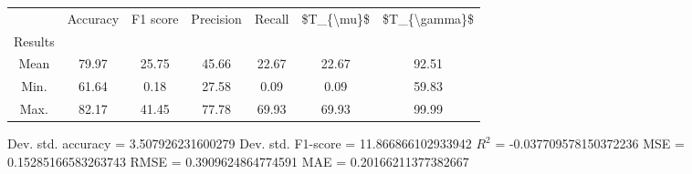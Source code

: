 \begin{tabular}{|c|c|c|c|c|c|c|}
\toprule
{} &  Accuracy &  F1 score &  Precision &  Recall &  \$T\_\{\textbackslash mu\}\$ &  \$T\_\{\textbackslash gamma\}\$ \\
Results &           &           &            &         &            &               \\
\hline
Mean    &     79.97 &     25.75 &      45.66 &   22.67 &      22.67 &         92.51 \\
Min.    &     61.64 &      0.18 &      27.58 &    0.09 &       0.09 &         59.83 \\
Max.    &     82.17 &     41.45 &      77.78 &   69.93 &      69.93 &         99.99 \\
\bottomrule
\end{tabular}

 Dev. std. accuracy = 3.507926231600279
 Dev. std. F1-score = 11.866866102933942
 $R^2$ = -0.037709578150372236
 MSE = 0.15285166583263743
 RMSE = 0.3909624864774591
 MAE = 0.20166211377382667
